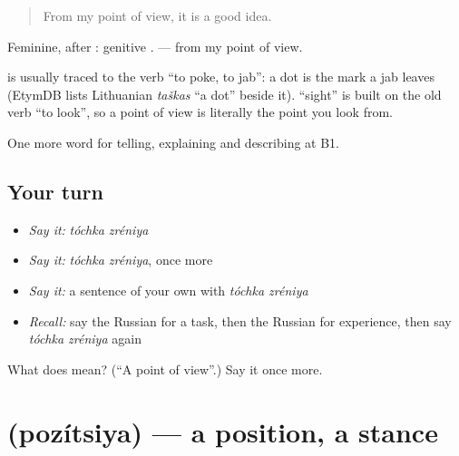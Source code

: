 \begin{quote}
From my point of view, it is a good idea.
\end{quote}

Feminine, after \emph{}: genitive \emph{ }. \emph{   } — from my point of view.

\begin{cousinweb}
\textbf{} is usually traced to the verb \emph{} \textquotedblleft{}to poke, to jab\textquotedblright{}: a dot is the mark a jab leaves (EtymDB lists Lithuanian \emph{taškas} \textquotedblleft{}a dot\textquotedblright{} beside it). \textbf{} \textquotedblleft{}sight\textquotedblright{} is built on the old verb \emph{} \textquotedblleft{}to look\textquotedblright{}, so a point of view is literally the point you look from.
\end{cousinweb}

\begin{grammarlens}[title={What you've built}]
One more word for telling, explaining and describing at B1.
\end{grammarlens}

\subsection*{Your turn}
\begin{itemize}
\raggedright
  \item \emph{Say it:} \emph{tóchka zréniya}
  \item \emph{Say it:} \emph{tóchka zréniya}, once more
  \item \emph{Say it:} a sentence of your own with \emph{tóchka zréniya}
  \item \emph{Recall:} say the Russian for a task, then the Russian for experience, then say \emph{tóchka zréniya} again
\end{itemize}

\begin{tcolorbox}[breakable,colback=teal!4,colframe=teal!35!black,title={Before you move on}]
What does   mean? (\textquotedblleft{}A point of view\textquotedblright{}.) Say it once more.
\end{tcolorbox}
\section[\texorpdfstring{\ru{позиция} (pozítsiya)}{позиция (pozítsiya)}]{ (pozítsiya) — a position, a stance}

